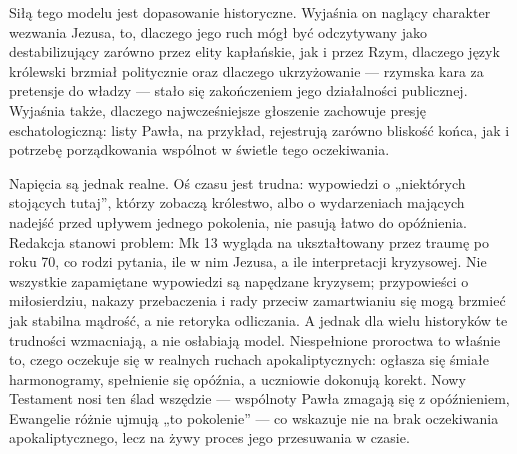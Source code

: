 Siłą tego modelu jest dopasowanie historyczne.
Wyjaśnia on naglący charakter wezwania Jezusa, to, dlaczego jego ruch mógł być odczytywany jako destabilizujący zarówno przez elity kapłańskie, jak i przez Rzym, dlaczego język królewski brzmiał politycznie oraz dlaczego ukrzyżowanie — rzymska kara za pretensje do władzy — stało się zakończeniem jego działalności publicznej.
Wyjaśnia także, dlaczego najwcześniejsze głoszenie zachowuje presję eschatologiczną: listy Pawła, na przykład, rejestrują zarówno bliskość końca, jak i potrzebę porządkowania wspólnot w świetle tego oczekiwania.

Napięcia są jednak realne.
Oś czasu jest trudna: wypowiedzi o „niektórych stojących tutaj”, którzy zobaczą królestwo, albo o wydarzeniach mających nadejść przed upływem jednego pokolenia, nie pasują łatwo do opóźnienia.
Redakcja stanowi problem: Mk 13 wygląda na ukształtowany przez traumę po roku 70, co rodzi pytania, ile w nim Jezusa, a ile interpretacji kryzysowej.
Nie wszystkie zapamiętane wypowiedzi są napędzane kryzysem; przypowieści o miłosierdziu, nakazy przebaczenia i rady przeciw zamartwianiu się mogą brzmieć jak stabilna mądrość, a nie retoryka odliczania.
A jednak dla wielu historyków te trudności wzmacniają, a nie osłabiają model.
Niespełnione proroctwa to właśnie to, czego oczekuje się w realnych ruchach apokaliptycznych: ogłasza się śmiałe harmonogramy, spełnienie się opóźnia, a uczniowie dokonują korekt.
Nowy Testament nosi ten ślad wszędzie — wspólnoty Pawła zmagają się z opóźnieniem, Ewangelie różnie ujmują „to pokolenie” — co wskazuje nie na brak oczekiwania apokaliptycznego, lecz na żywy proces jego przesuwania w czasie.

